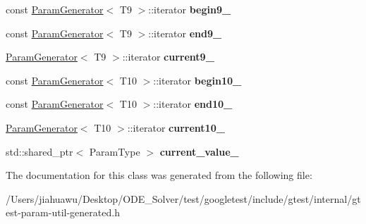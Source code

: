 \begin{DoxyCompactItemize}
\item 
\mbox{\label{classtesting_1_1internal_1_1_cartesian_product_generator10_1_1_iterator_abc7c1588adb4c27e090c6de23016b58c}} 
const \mbox{\hyperlink{classtesting_1_1internal_1_1_param_generator}{Param\+Generator}}$<$ T9 $>$\+::iterator {\bfseries begin9\+\_\+}
\item 
\mbox{\label{classtesting_1_1internal_1_1_cartesian_product_generator10_1_1_iterator_adc5d33dd5a9860613d2518bd6860d17d}} 
const \mbox{\hyperlink{classtesting_1_1internal_1_1_param_generator}{Param\+Generator}}$<$ T9 $>$\+::iterator {\bfseries end9\+\_\+}
\item 
\mbox{\label{classtesting_1_1internal_1_1_cartesian_product_generator10_1_1_iterator_a5c0567f6a9573593a45aff1e989fe9db}} 
\mbox{\hyperlink{classtesting_1_1internal_1_1_param_generator}{Param\+Generator}}$<$ T9 $>$\+::iterator {\bfseries current9\+\_\+}
\item 
\mbox{\label{classtesting_1_1internal_1_1_cartesian_product_generator10_1_1_iterator_a0f7a105284accd72e56e71efe63edb8e}} 
const \mbox{\hyperlink{classtesting_1_1internal_1_1_param_generator}{Param\+Generator}}$<$ T10 $>$\+::iterator {\bfseries begin10\+\_\+}
\item 
\mbox{\label{classtesting_1_1internal_1_1_cartesian_product_generator10_1_1_iterator_a4e1eff374860760ab0583b3b30bf756e}} 
const \mbox{\hyperlink{classtesting_1_1internal_1_1_param_generator}{Param\+Generator}}$<$ T10 $>$\+::iterator {\bfseries end10\+\_\+}
\item 
\mbox{\label{classtesting_1_1internal_1_1_cartesian_product_generator10_1_1_iterator_ae729bdadc391f4f3be20055d7b0b12bd}} 
\mbox{\hyperlink{classtesting_1_1internal_1_1_param_generator}{Param\+Generator}}$<$ T10 $>$\+::iterator {\bfseries current10\+\_\+}
\item 
\mbox{\label{classtesting_1_1internal_1_1_cartesian_product_generator10_1_1_iterator_aff75970fb603c690af7ddfa391fe2799}} 
std\+::shared\+\_\+ptr$<$ Param\+Type $>$ {\bfseries current\+\_\+value\+\_\+}
\end{DoxyCompactItemize}


The documentation for this class was generated from the following file\+:\begin{DoxyCompactItemize}
\item 
/\+Users/jiahuawu/\+Desktop/\+O\+D\+E\+\_\+\+Solver/test/googletest/include/gtest/internal/gtest-\/param-\/util-\/generated.\+h\end{DoxyCompactItemize}
